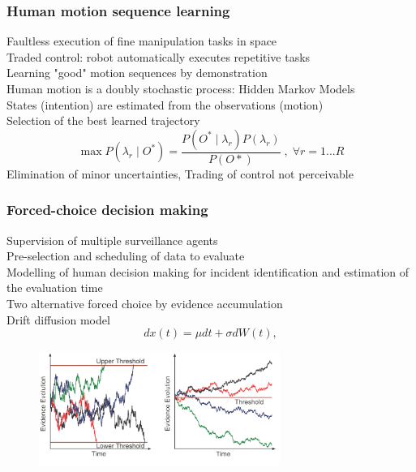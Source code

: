 \documentclass[student]{ITRslides}
\begin{document}
\begin{frame}
	\frametitle{Human motion sequence learning}
{\small Faultless execution of fine manipulation tasks in space \\
Traded control: robot automatically executes repetitive tasks\\
Learning "good" motion sequences by demonstration\\
Human motion is a doubly stochastic process: Hidden Markov Models\\
States (intention) are estimated from the observations (motion)\\
Selection of the best learned trajectory 
\[
\max P(\lambda_r \mid O^*) = \frac{P(O^* \mid \lambda_r) P(\lambda_r)}{P(O*)} \; , \; \forall r=1...R
\]
Elimination of minor uncertainties, Trading of control not perceivable}
			\begin{figure}
			\centering
			\tiny
			\def\svgwidth{0.8\columnwidth}
											
			\end{figure}	 
	
	
\end{frame}

\begin{frame}
	\frametitle{Forced-choice decision making}
	{\normalsize
Supervision of multiple surveillance agents\\
Pre-selection and scheduling of data to evaluate\\
Modelling of human decision making for incident identification and estimation of the evaluation time\\
Two alternative forced choice by evidence accumulation\\
Drift diffusion model
\[
dx(t) = \mu dt + \sigma dW(t),
\]}
 	\begin{figure}
			\centering
			\includegraphics[width=0.7\textwidth]{EvidenceAcc.png}			
	\end{figure}
	 
	
	
\end{frame}
\end{document}
